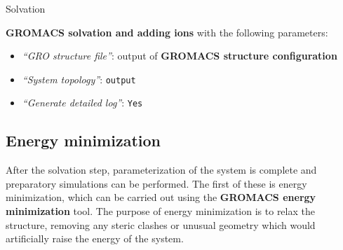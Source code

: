 \documentclass[twocolumn]{bmcart}%
\providecommand{\tightlist}{%
  \setlength{\itemsep}{0pt}\setlength{\parskip}{0pt}}
\begin{document}
\begin{handson_box_colour}{Solvation}


  \textbf{GROMACS solvation and adding ions} with the following
  parameters:
  \begin{itemize}
  \tightlist
  \item
    \emph{``GRO structure file''}: output of
    \textbf{GROMACS structure configuration}
  \item
    \emph{``System topology''}: \texttt{output}
  \item
    \emph{``Generate detailed log''}: \texttt{Yes}
  \end{itemize}

\end{handson_box_colour}

\subsection*{Energy minimization}\label{energy-minimization}

After the solvation step, parameterization of the system is complete and preparatory simulations can be performed. The first of these is energy minimization, which can be carried out using the
\textbf{GROMACS energy minimization} tool. The purpose of energy minimization is to relax the structure, removing any steric clashes or unusual geometry which would artificially raise the energy of the system.
\end{document}
